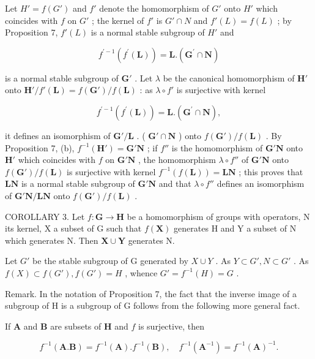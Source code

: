 Let \(H' = f(G')\) and \(f'\) denote the homomorphism of \(G'\) onto \(H'\) which coincides with \(f\) on \(G'\) ; the kernel of \(f'\) is \(G' \cap N\) and \(f'(L) = f(L)\) ; by Proposition 7, \(f'(L)\) is a normal stable subgroup of \(H'\) and

\[
f ^ {\prime - 1} (f ^ {\prime} (\mathbf {L})) = \mathbf {L}. (\mathbf {G} ^ {\prime} \cap \mathbf {N})
\]

is a normal stable subgroup of \(\mathbf{G}'\) . Let \(\lambda\) be the canonical homomorphism of \(\mathbf{H}'\) onto \(\mathbf{H}' / f'(\mathbf{L}) = f(\mathbf{G}') / f(\mathbf{L})\) : as \(\lambda \circ f'\) is surjective with kernel

\[
f ^ {\prime - 1} (f ^ {\prime} (\mathbf {L})) = \mathbf {L}. (\mathbf {G} ^ {\prime} \cap \mathbf {N}),
\]

it defines an isomorphism of \(\mathbf{G}' / \mathbf{L}\) . ( \(\mathbf{G}' \cap \mathbf{N}\) ) onto \(f(\mathbf{G}') / f(\mathbf{L})\) . By Proposition 7, (b), \(f^{-1}(\mathbf{H}') = \mathbf{G}'\mathbf{N}\) ; if \(f''\) is the homomorphism of \(\mathbf{G}'\mathbf{N}\) onto \(\mathbf{H}'\) which coincides with \(f\) on \(\mathbf{G}'\mathbf{N}\) , the homomorphism \(\lambda \circ f''\) of \(\mathbf{G}'\mathbf{N}\) onto \(f(\mathbf{G}') / f(\mathbf{L})\) is surjective with kernel \(f^{-1}(f(\mathbf{L})) = \mathbf{L}\mathbf{N}\) ; this proves that \(\mathbf{L}\mathbf{N}\) is a normal stable subgroup of \(\mathbf{G}'\mathbf{N}\) and that \(\lambda \circ f''\) defines an isomorphism of \(\mathbf{G}'\mathbf{N} / \mathbf{L}\mathbf{N}\) onto \(f(\mathbf{G}') / f(\mathbf{L})\) .

COROLLARY 3. Let \(f: \mathbf{G} \to \mathbf{H}\) be a homomorphism of groups with operators, N its kernel, X a subset of G such that \(f(\mathbf{X})\) generates H and Y a subset of N which generates N. Then \(\mathbf{X} \cup \mathbf{Y}\) generates N.

Let \(G'\) be the stable subgroup of G generated by \(X \cup Y\) . As \(Y \subset G', N \subset G'\) . As \(f(X) \subset f(G'), f(G') = H\) , whence \(G' = f^{-1}(H) = G\) .

Remark. In the notation of Proposition 7, the fact that the inverse image of a subgroup of H is a subgroup of G follows from the following more general fact.

If \(\mathbf{A}\) and \(\mathbf{B}\) are subsets of \(\mathbf{H}\) and \(f\) is surjective, then

\[
f^{-1} (\mathbf {A}. \mathbf {B}) = f^{-1} (\mathbf {A}). f^{-1} (\mathbf {B}), \quad f^{-1} (\mathbf {A} ^ {- 1}) = f^{-1} (\mathbf {A}) ^ {- 1}.
\]

